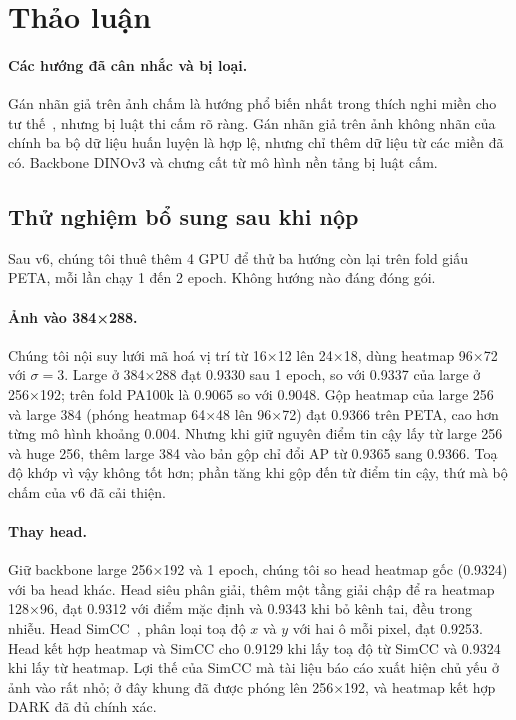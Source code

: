 \documentclass[11pt,a4paper]{article}
\begin{document}
\section{Thảo luận}

\paragraph{Các hướng đã cân nhắc và bị loại.} Gán nhãn giả trên ảnh chấm là hướng phổ biến nhất trong thích nghi miền cho tư thế~\cite{regda,kim2022}, nhưng bị luật thi cấm rõ ràng. Gán nhãn giả trên ảnh không nhãn của chính ba bộ dữ liệu huấn luyện là hợp lệ, nhưng chỉ thêm dữ liệu từ các miền đã có. Backbone DINOv3 và chưng cất từ mô hình nền tảng bị luật cấm.

\subsection{Thử nghiệm bổ sung sau khi nộp}
\label{sec:extra}

Sau v6, chúng tôi thuê thêm 4 GPU để thử ba hướng còn lại trên fold giấu PETA, mỗi lần chạy 1 đến 2 epoch. Không hướng nào đáng đóng gói.

\paragraph{Ảnh vào 384×288.} Chúng tôi nội suy lưới mã hoá vị trí từ 16×12 lên 24×18, dùng heatmap 96×72 với $\sigma=3$. Large ở 384×288 đạt 0.9330 sau 1 epoch, so với 0.9337 của large ở 256×192; trên fold PA100k là 0.9065 so với 0.9048. Gộp heatmap của large 256 và large 384 (phóng heatmap 64×48 lên 96×72) đạt 0.9366 trên PETA, cao hơn từng mô hình khoảng 0.004. Nhưng khi giữ nguyên điểm tin cậy lấy từ large 256 và huge 256, thêm large 384 vào bản gộp chỉ đổi AP từ 0.9365 sang 0.9366. Toạ độ khớp vì vậy không tốt hơn; phần tăng khi gộp đến từ điểm tin cậy, thứ mà bộ chấm của v6 đã cải thiện.

\paragraph{Thay head.} Giữ backbone large 256×192 và 1 epoch, chúng tôi so head heatmap gốc (0.9324) với ba head khác. Head siêu phân giải, thêm một tầng giải chập để ra heatmap 128×96, đạt 0.9312 với điểm mặc định và 0.9343 khi bỏ kênh tai, đều trong nhiễu. Head SimCC~\cite{simcc}, phân loại toạ độ $x$ và $y$ với hai ô mỗi pixel, đạt 0.9253. Head kết hợp heatmap và SimCC cho 0.9129 khi lấy toạ độ từ SimCC và 0.9324 khi lấy từ heatmap. Lợi thế của SimCC mà tài liệu báo cáo xuất hiện chủ yếu ở ảnh vào rất nhỏ; ở đây khung đã được phóng lên 256×192, và heatmap kết hợp DARK đã đủ chính xác.
\end{document}
